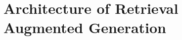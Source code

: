\documentclass[../main.tex]{subfiles}
\begin{document}
\chapter{Architecture of Retrieval Augmented Generation}
























\printglossaries
\end{document}
